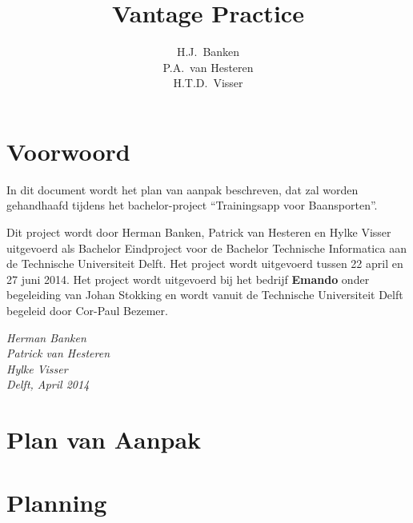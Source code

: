 \documentclass[dutch]{style/tudelft-report}
\begin{document}
\def \mylaps {MyLaps\xspace}


\frontmatter

\title[Bachelorproject \\ ~ \\ Plan van Aanpak]{Vantage Practice}
\author{H.J.\ Banken \\ P.A.\ van Hesteren \\ H.T.D.\ Visser}



\chapter{Voorwoord}
In dit document wordt het plan van aanpak beschreven, dat zal worden gehandhaafd tijdens het bachelor-project “Trainingsapp voor Baansporten”. 

\bigskip

\noindent
Dit project wordt door Herman Banken, Patrick van Hesteren en Hylke Visser uitgevoerd als Bachelor Eindproject voor de Bachelor Technische Informatica aan de Technische Universiteit Delft. Het project wordt uitgevoerd tussen 22 april en 27 juni 2014. Het project wordt uitgevoerd bij het bedrijf \textbf{Emando} onder begeleiding van Johan Stokking en wordt vanuit de Technische Universiteit Delft begeleid door Cor-Paul Bezemer. 

\bigskip

\begin{flushright}
{\makeatletter\itshape
    Herman Banken \\
    Patrick van Hesteren \\
    Hylke Visser \\
    Delft, April 2014
\makeatother}
\end{flushright}

\tableofcontents

\mainmatter

\chapter{Plan van Aanpak} \label{ch:plan-van-aanpak} 

\appendix



\chapter{Planning} \label{ch:planning} 

%
\end{document}
